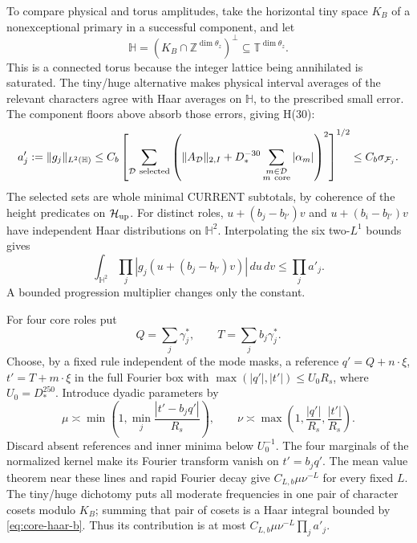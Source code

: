 To compare physical and torus amplitudes, take the horizontal tiny
space \(K_B\) of a nonexceptional primary in a successful component,
and let
\[
 \mathbb H=(K_B\cap\mathbb Z^{\dim\theta_z})^\perp
                   \subseteq\mathbb T^{\dim\theta_z}.
\]
This is a connected torus because the integer lattice being
annihilated is saturated.  The tiny/huge alternative makes physical
interval averages of the relevant characters agree with Haar
averages on \(\mathbb H\), to the prescribed small error.
The component floors above absorb those errors, giving H(30):
\[
 a'_j:=\|g_j\|_{L^2(\mathbb H)}
 \le C_b\left[
   \sum_{\mathcal D\ {\rm selected}}
    \left(\|A_{\mathcal D}\|_{2,I}
       +D_*^{-30}\sum_{\substack{m\in\mathcal D\\m\ {\rm core}}}
                                      |\alpha_m|\right)^2
        \right]^{1/2}
 \le C_b\sigma_{\mathcal F_j}.
\]
The selected sets are whole minimal CURRENT subtotals, by coherence
of the height predicates on \(\mathcal H_{\rm up}\).  For distinct
roles, \(u+(b_j-b_{l'})v\) and \(u+(b_i-b_{l'})v\) have independent
Haar distributions on \(\mathbb H^2\).  Interpolating the six
two-\(L^1\) bounds gives
\begin{equation}\label{eq:core-haar-b}
 \int_{\mathbb H^2}\prod_j|g_j(u+(b_j-b_{l'})v)|\,du\,dv
             \le\prod_j a'_j.
\end{equation}
A bounded progression multiplier changes only the constant.

For four core roles put
\[
 Q=\sum_j\gamma_j^*,\qquad T=\sum_jb_j\gamma_j^*.
\]
Choose, by a fixed rule independent of the mode masks, a reference
\(q'=Q+n\cdot\xi\), \(t'=T+m\cdot\xi\) in the full Fourier
box with \(\max(|q'|,|t'|)\le U_0R_s\), where
\(U_0=D_*^{250}\).  Introduce dyadic parameters by
\begin{equation}\label{eq:four-core-test-b}
 \mu\asymp\min\left(1,\min_j\frac{|t'-b_jq'|}{R_s}\right),
 \qquad
 \nu\asymp\max\left(1,\frac{|q'|}{R_s},\frac{|t'|}{R_s}\right).
\end{equation}
Discard absent references and inner minima below \(U_0^{-1}\).
The four marginals of the normalized kernel make its Fourier
transform vanish on \(t'=b_jq'\).  The mean value theorem near
these lines and rapid Fourier decay give
\(C_{L,b}\mu\nu^{-L}\) for every fixed \(L\).  The tiny/huge
dichotomy puts all moderate frequencies in one pair of character
cosets modulo \(K_B\); summing that pair of cosets is a Haar
integral bounded by \eqref{eq:core-haar-b}.  Thus its contribution
is at most \(C_{L,b}\mu\nu^{-L}\prod_j a'_j\).

